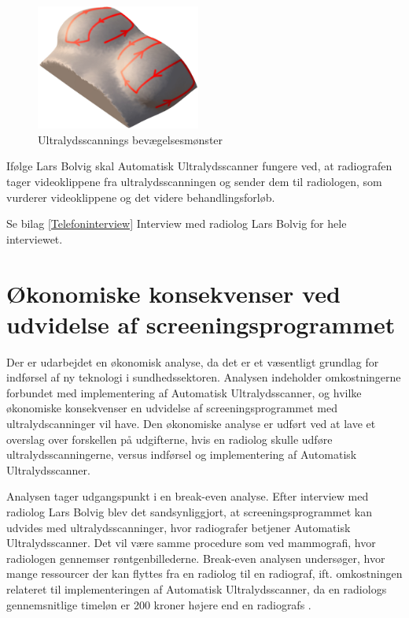 \begin{figure}
  \begin{center}
    \includegraphics[width=0.48\textwidth]{figurer/d/probebevagelse}
  \end{center}
    \caption{Ultralydsscannings bevægelsesmønster}
    \label{Probensbevagelse}
\end{figure}
Ifølge Lars Bolvig skal Automatisk Ultralydsscanner fungere ved, at radiografen tager videoklippene fra ultralydsscanningen og sender dem til radiologen, som vurderer videoklippene og det videre behandlingsforløb.

Se bilag \ref{Telefoninterview} Interview med radiolog Lars Bolvig for hele interviewet. 
\newpage

\section{Økonomiske konsekvenser ved udvidelse af screeningsprogrammet} 
Der er udarbejdet en økonomisk analyse, da det er et væsentligt grundlag for indførsel af ny teknologi i sundhedssektoren. Analysen indeholder omkostningerne forbundet med implementering af Automatisk Ultralydsscanner, og hvilke økonomiske konsekvenser en udvidelse af screeningsprogrammet med ultralydscanninger vil have. Den økonomiske analyse er udført ved at lave et overslag over forskellen på udgifterne, hvis en radiolog skulle udføre ultralydsscanningerne, versus indførsel og implementering af Automatisk Ultralydsscanner. 

Analysen tager udgangspunkt i en break-even analyse.  Efter interview med radiolog Lars Bolvig blev det sandsynliggjort, at screeningsprogrammet kan udvides med ultralydsscanninger, hvor radiografer betjener Automatisk Ultralydsscanner. Det vil være samme procedure som ved mammografi, hvor radiologen gennemser røntgenbillederne. Break-even analysen undersøger, hvor mange ressourcer der kan flyttes fra en radiolog til en radiograf, ift. omkostningen relateret til implementeringen af Automatisk Ultralydsscanner, da en radiologs gennemsnitlige timeløn er 200 kroner højere end en radiografs \cite{Lon}.

